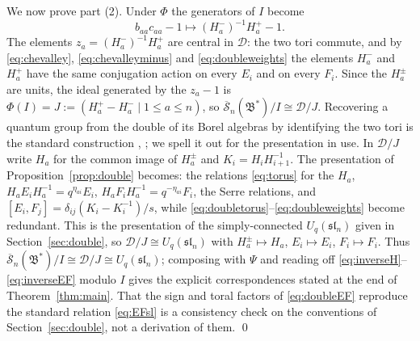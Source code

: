 \documentclass[12pt]{article}
\theoremstyle{remark}
\newcommand{\U}{U_q}
\newcommand{\slN}{\mathfrak{sl}_n}
\newcommand{\redS}{\overline{\mathcal S}_n}
\newcommand{\Bstar}{\mathfrak B^*}
\newcommand{\cD}{\mathcal D}
\begin{document}
We now prove part (2). Under $\Phi$ the generators of $I$ become
\begin{equation}\label{eq:idealimage}
 b_{aa}c_{aa}-1\longmapsto(H^-_a)^{-1}H^+_a-1 .
\end{equation}
The elements $z_a=(H^-_a)^{-1}H^+_a$ are central in $\cD$: the two
tori commute, and by \eqref{eq:chevalley},
\eqref{eq:chevalleyminus} and \eqref{eq:doubleweights} the elements
$H^-_a$ and $H^+_a$ have the same conjugation action on every $E_i$ and
on every $F_i$. Since the $H^\pm_a$ are units, the ideal generated by
the $z_a-1$ is $\Phi(I)=J:=(H^+_a-H^-_a\mid1\le a\le n)$, so
$\redS(\Bstar)/I\cong\cD/J$. Recovering a
quantum group from the double of its Borel algebras by identifying the
two tori is the standard construction \cite[Section 13]{Dr},
\cite[Section 8.2.4]{KS}; we spell it out for the presentation in use. In $\cD/J$ write $H_a$ for the common image of
$H^\pm_a$ and $K_i=H_iH_{i+1}^{-1}$. The presentation of
Proposition~\ref{prop:double} becomes: the relations \eqref{eq:torus}
for the $H_a$, $H_aE_iH_a^{-1}=q^{\eta_{ai}}E_i$,
$H_aF_iH_a^{-1}=q^{-\eta_{ai}}F_i$, the Serre relations, and
$[E_i,F_j]=\delta_{ij}(K_i-K_i^{-1})/s$, while
\eqref{eq:doubletorus}--\eqref{eq:doubleweights} become redundant. This
is the presentation of the simply-connected $\U(\slN)$ given in
Section~\ref{sec:double}, so $\cD/J\cong\U(\slN)$ with
$H^\pm_a\mapsto H_a$, $E_i\mapsto E_i$, $F_i\mapsto F_i$.
Thus $\redS(\Bstar)/I\cong\cD/J\cong\U(\slN)$; composing with $\Psi$
and reading off \eqref{eq:inverseH}--\eqref{eq:inverseEF} modulo $I$
gives the explicit correspondences stated at the end of
Theorem~\ref{thm:main}. That the sign and toral factors of \eqref{eq:doubleEF}
reproduce the standard relation \eqref{eq:EFsl} is a consistency check
on the conventions of Section~\ref{sec:double}, not a derivation of
them. \qed
\end{document}
